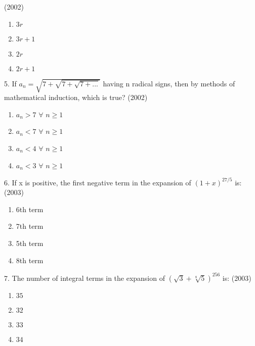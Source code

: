 \documentclass[journal,12pt,twocolumn]{IEEEtran}
\theoremstyle{remark}
\begin{document}
\hfill{(2002)}
\begin{enumerate}[label=(\alph*)]
\item $3r$
\item $3r+1$
\item $2r$
\item $2r+1$
\end{enumerate}
5. If $a_n = \sqrt{7+\sqrt{7+\sqrt{7+...}}}$ having n radical signs, then by methods of mathematical induction, which is true?
\hfill{(2002)}
\begin{enumerate}[label=(\alph*)]
\item $a_n > 7$  $\forall$ $n \ge 1$
\item $a_n < 7$  $\forall$ $n \ge 1$
\item $a_n < 4$  $\forall$ $n \ge 1$
\item $a_n < 3$  $\forall$ $n \ge 1$
\end{enumerate}
6. If x is positive, the first negative term in the expansion of $(1+x)^{27/5}$ is:
\hfill{(2003)}
\begin{enumerate}[label=(\alph*)]
\item 6th term
\item 7th term
\item 5th term
\item 8th term
\end{enumerate}
7. The number of integral terms in the expansion of $(\sqrt{3}+\sqrt[8]{5})^{256}$ is:
\hfill{(2003)}
\begin{enumerate}[label=(\alph*)]
\item $35$
\item $32$
\item $33$
\item $34$
\end{enumerate}
\end{document}
